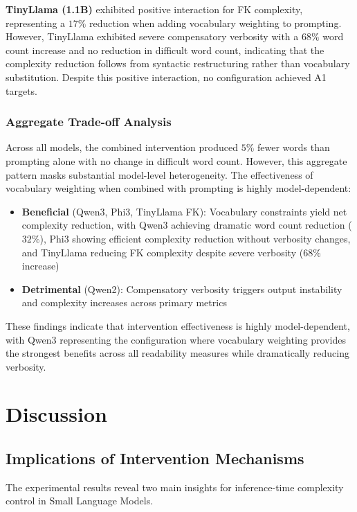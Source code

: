 \documentclass[10pt, a4paper]{article}
\begin{document}
\textbf{TinyLlama (1.1B)} exhibited positive interaction for FK complexity, representing a $17\%$ reduction when adding vocabulary weighting to prompting. However, TinyLlama exhibited severe compensatory verbosity with a $68\%$ word count increase and no reduction in difficult word count, indicating that the complexity reduction follows from syntactic restructuring rather than vocabulary substitution. Despite this positive interaction, no configuration achieved A1 targets.

\subsubsection{Aggregate Trade-off Analysis}

Across all models, the combined intervention produced $5\%$ fewer words than prompting alone with no change in difficult word count. However, this aggregate pattern masks substantial model-level heterogeneity. The effectiveness of vocabulary weighting when combined with prompting is highly model-dependent:

 \begin{itemize}
     \item \textbf{Beneficial} (Qwen3, Phi3, TinyLlama FK): Vocabulary constraints yield net complexity reduction, with Qwen3 achieving dramatic word count reduction ($32\%$), Phi3 showing efficient complexity reduction without verbosity changes, and TinyLlama reducing FK complexity despite severe verbosity ($68\%$ increase)
     \item \textbf{Detrimental} (Qwen2): Compensatory verbosity triggers output instability and complexity increases across primary metrics
 \end{itemize}

These findings indicate that intervention effectiveness is highly model-dependent, with Qwen3 representing the configuration where vocabulary weighting provides the strongest benefits across all readability measures while dramatically reducing verbosity.

\section{Discussion}

\subsection{Implications of Intervention Mechanisms}

The experimental results reveal two main insights for inference-time complexity control in Small Language Models.
\end{document}
